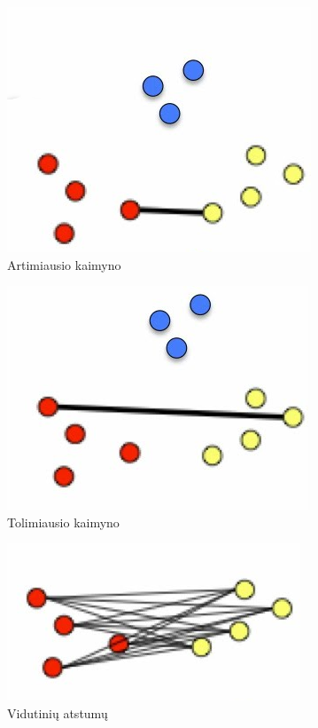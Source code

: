 \documentclass{VUMIFInfKursinis}
\begin{document}
\begin{figure}[H]
  \centering
  \begin{subfigure}[b]{.3\textwidth}
    \includegraphics[scale=1]{img/single}
    \centering
    \caption{Artimiausio kaimyno}
  \end{subfigure}
  \begin{subfigure}[b]{.3\textwidth}
    \includegraphics[scale=1]{img/complete}
    \centering
    \caption{Tolimiausio kaimyno}
  \end{subfigure}
  \begin{subfigure}[b]{.3\textwidth}
    \includegraphics[scale=1]{img/average}
    \centering
    \caption{Vidutinių atstumų}
  \end{subfigure}
  \begin{subfigure}[b]{.3\textwidth}

\end{subfigure}
\end{figure}
\end{document}
